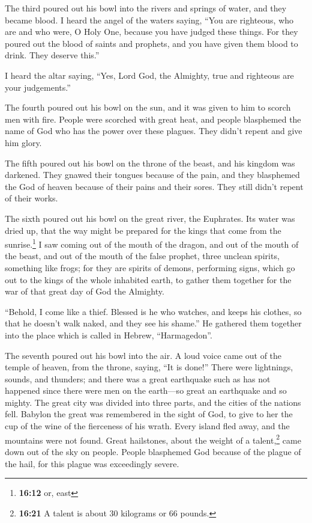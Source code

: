  The third poured out his bowl into the rivers and springs
of water, and they became blood.  I heard the angel of the
waters saying, ``You are righteous, who are and who were, O Holy One,
because you have judged these things.  For they poured out
the blood of saints and prophets, and you have given them blood to
drink. They deserve this.''

 I heard the altar saying, ``Yes, Lord God, the Almighty,
true and righteous are your judgements.''

 The fourth poured out his bowl on the sun, and it was
given to him to scorch men with fire.  People were
scorched with great heat, and people blasphemed the name of God who has
the power over these plagues. They didn't repent and give him glory.

 The fifth poured out his bowl on the throne of the
beast, and his kingdom was darkened. They gnawed their tongues because
of the pain,  and they blasphemed the God of heaven
because of their pains and their sores. They still didn't repent of
their works.

 The sixth poured out his bowl on the great river, the
Euphrates. Its water was dried up, that the way might be prepared for
the kings that come from the sunrise.\footnote{\textbf{16:12} or, east}
 I saw coming out of the mouth of the dragon, and out of
the mouth of the beast, and out of the mouth of the false prophet, three
unclean spirits, something like frogs;  for they are
spirits of demons, performing signs, which go out to the kings of the
whole inhabited earth, to gather them together for the war of that great
day of God the Almighty.

 ``Behold, I come like a thief. Blessed is he who
watches, and keeps his clothes, so that he doesn't walk naked, and they
see his shame.''  He gathered them together into the
place which is called in Hebrew, ``Harmagedon''.

 The seventh poured out his bowl into the air. A loud
voice came out of the temple of heaven, from the throne, saying, ``It is
done!''  There were lightnings, sounds, and thunders; and
there was a great earthquake such as has not happened since there were
men on the earth---so great an earthquake and so mighty. 
The great city was divided into three parts, and the cities of the
nations fell. Babylon the great was remembered in the sight of God, to
give to her the cup of the wine of the fierceness of his wrath.
 Every island fled away, and the mountains were not
found.  Great hailstones, about the weight of a
talent,\footnote{\textbf{16:21} A talent is about 30 kilograms or 66
  pounds.} came down out of the sky on people. People blasphemed God
because of the plague of the hail, for this plague was exceedingly
severe.

